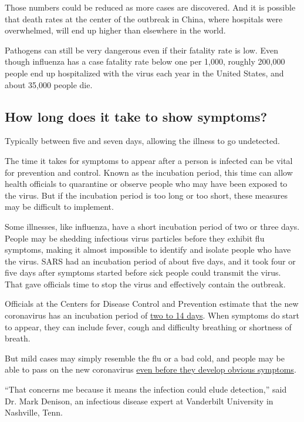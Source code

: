 Those numbers could be reduced as more cases are discovered. And it is
possible that death rates at the center of the outbreak in China, where
hospitals were overwhelmed, will end up higher than elsewhere in the
world.

Pathogens can still be very dangerous even if their fatality rate is
low. Even though influenza has a case fatality rate below one per 1,000,
roughly 200,000 people end up hospitalized with the virus each year in
the United States, and about 35,000 people die.

\hypertarget{how-long-does-it-take-to-show-symptoms}{%
\subsection{How long does it take to show
symptoms?}\label{how-long-does-it-take-to-show-symptoms}}

Typically between five and seven days, allowing the illness to go
undetected.

The time it takes for symptoms to appear after a person is infected can
be vital for prevention and control. Known as the incubation period,
this time can allow health officials to quarantine or observe people who
may have been exposed to the virus. But if the incubation period is too
long or too short, these measures may be difficult to implement.

Some illnesses, like influenza, have a short incubation period of two or
three days. People may be shedding infectious virus particles before
they exhibit flu symptoms, making it almost impossible to identify and
isolate people who have the virus. SARS had an incubation period of
about five days, and it took four or five days after symptoms started
before sick people could transmit the virus. That gave officials time to
stop the virus and effectively contain the outbreak.

Officials at the Centers for Disease Control and Prevention estimate
that the new coronavirus has an incubation period of
\href{https://www.cdc.gov/coronavirus/2019-ncov/about/symptoms.html}{two
to 14 days}. When symptoms do start to appear, they can include fever,
cough and difficulty breathing or shortness of breath.

But mild cases may simply resemble the flu or a bad cold, and people may
be able to pass on the new coronavirus
\href{https://www.nytimes.com/2020/02/26/health/coronavirus-asymptomatic.html}{even
before they develop obvious symptoms}.

``That concerns me because it means the infection could elude
detection,'' said Dr. Mark Denison, an infectious disease expert at
Vanderbilt University in Nashville, Tenn.

